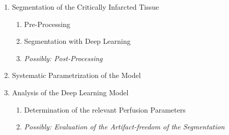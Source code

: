 \documentclass{article}%
\begin{document}
\begin{enumerate}
\item Segmentation of the Critically Infarcted Tissue 
\begin{enumerate}
\item Pre-Processing 
\item Segmentation with Deep Learning 
\item \textit{Possibly: Post-Processing}
\end{enumerate}
\item Systematic Parametrization of the Model
\item Analysis of the Deep Learning Model
\begin{enumerate}
\item Determination of the relevant Perfusion Parameters
\item \textit{Possibly: Evaluation of the Artifact-freedom of the Segmentation}
\end{enumerate}
\end{enumerate}
   


\end{document}
